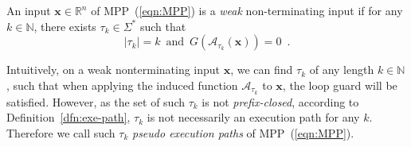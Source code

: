 \documentclass{jssc}
\newcommand{\A}{\mathcal{A}}
\newcommand{\xx}{\mathbf{x}}
\begin{document}
\begin{definition}\label{def:WNT}
An input $\xx \in \mathbb{R}^n$ of MPP~(\ref{eqn:MPP}) is a \emph{weak} non-terminating input if for any $k \in \mathbb{N}$, there exists $\tau_k \in\Sigma^*$ such that
\begin{equation}\label{eqn:wnt}
|\tau_k|=k \,\mbox{ and }\, G(\A_{\tau_k}(\xx))=0 \enspace.
\end{equation}
\end{definition}

Intuitively, on a weak nonterminating input $\xx$, we can find $\tau_k$ of any length $k \in \mathbb{N}$, such that when applying the induced function $\A_{\tau_k}$ to $\xx$, the loop guard will be satisfied. However, as the set of such $\tau_k$ is not \emph{prefix-closed}, according to Definition~\ref{dfn:exe-path}, $\tau_k$ is not necessarily an execution path for any $k$. Therefore we call such $\tau_k$ \emph{pseudo execution paths} of MPP~(\ref{eqn:MPP}).
\end{document}
